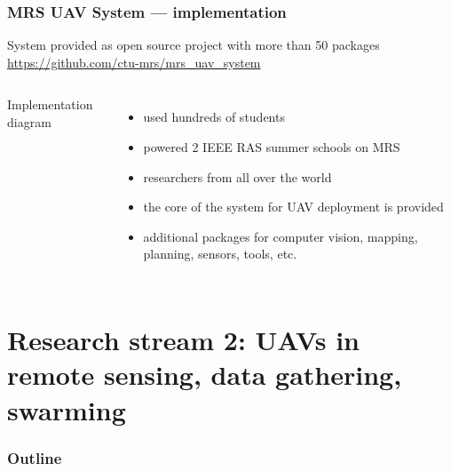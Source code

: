\documentclass[aspectratio=169]{beamer}
\begin{document}
\begin{frame}
\frametitle{MRS UAV System --- implementation}

\begin{block}{System provided as open source project with more than 50 packages}
  \centering
  \url{https://github.com/ctu-mrs/mrs_uav_system}
\end{block}

\begin{columns}[c]


\begin{block}{Implementation diagram}
  \begin{adjustbox}{max totalsize={1.0\textwidth}{.65\textheight}, center}
    
  \end{adjustbox}
\end{block}


\begin{itemize}
  \item used hundreds of students
  \item powered 2 IEEE RAS summer schools on MRS
  \item researchers from all over the world
  \item the core of the system for UAV deployment is provided
  \item additional packages for computer vision, mapping, planning, sensors, tools, etc.
\end{itemize}

\end{columns}

\end{frame}



\section{Research stream 2: UAVs in remote sensing, data gathering, swarming}

\begin{frame}
  \frametitle{Outline}
  \tableofcontents[currentsection]
\end{frame}


\end{document}
